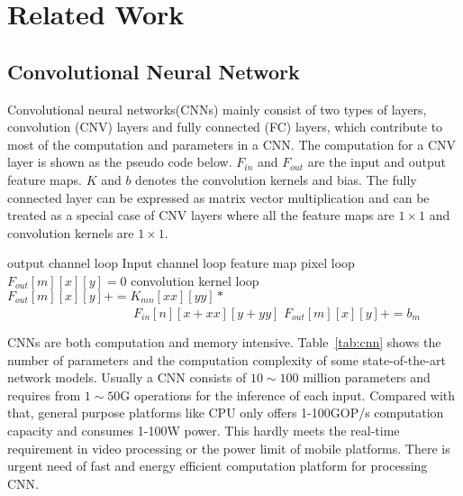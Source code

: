 \section{Related Work}\label{sec:related}


\subsection{Convolutional Neural Network}
Convolutional neural networks(CNNs) mainly consist of two types of layers, convolution (CNV) layers and fully connected (FC) layers, which contribute to most of the computation and parameters in a CNN. The computation for a CNV layer is shown as the pseudo code below. $F_{in}$ and $F_{out}$ are the input and output feature maps. $K$ and $b$ denotes the convolution kernels and bias. The fully connected layer can be expressed as matrix vector multiplication and can be treated as a special case of CNV layers where all the feature maps are $1\times 1$ and convolution kernels are $1\times 1$.

\begin{codebox}
\li {} \Comment output channel loop
  \Do
\li   {} \Comment Input channel loop
    \Do
\li  	\Comment feature map pixel loop
\li 	{}
    \Do
\li   	  $F_{out}[m][x][y]=0$
\li 	  \Comment convolution kernel loop
\li 	  {}
          \Do
\li 		$F_{out}[m][x][y] += K_{mn}[xx][yy]*$\\
      $\qquad\qquad\qquad\qquad\qquad F_{in}[n][x+xx][y+yy] $
          \End
\li 	  $F_{out}[m][x][y]+=b_m$
        \End 
    \End
    \End 
\end{codebox}

CNNs are both computation and memory intensive. Table~\ref{tab:cnn} shows the number of parameters and the computation complexity of some state-of-the-art network models. Usually a CNN consists of $10\sim 100$ million parameters and requires from $1\sim 50$G operations for the inference of each input. Compared with that, general purpose platforms like CPU only offers 1-100GOP/s computation capacity and consumes 1-100W power. This hardly meets the real-time requirement in video processing or the power limit of mobile platforms. There is urgent need of fast and energy efficient computation platform for processing CNN.



